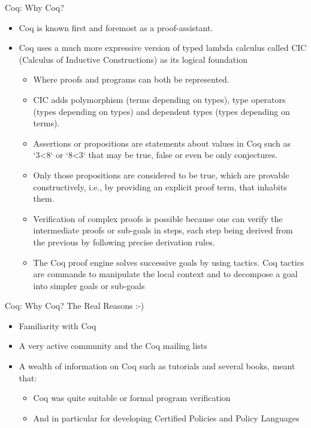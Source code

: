 \documentclass{beamer}
\begin{document}
\begin{frame}[fragile]{Coq: Why Coq?}
\small
\begin{itemize}
\item Coq is known first and foremost as a proof-assistant.
\item Coq uses a much more expressive version of typed lambda calculus called CIC (Calculus of Inductive Constructions) as its logical foundation
    \begin{itemize}
       \item Where proofs and programs can both be represented.
       \item CIC adds polymorphism (terms depending on types), type operators (types depending on types) and dependent types (types depending on terms).
       \item Assertions or propositions are statements about values in Coq such as `3<8` or `8<3` that may be true, false or even be only conjectures. 
       \item Only those propositions are considered to be true, which are provable constructively, i.e., by providing an explicit proof term, that inhabits them.
       \item Verification of complex proofs is possible because one can verify the intermediate proofs or sub-goals in steps, each step being derived from the previous by following precise derivation rules. 
       \item The Coq proof engine solves successive goals by using tactics. Coq tactics are commands to manipulate the local context and to decompose a goal into simpler goals or sub-goals
   \end{itemize}
\end{itemize}
\end{frame}
\begin{frame}[fragile]{Coq: Why Coq? The Real Reasons :-)}
\Large
\begin{itemize}
\item Familiarity with Coq 
\item A very active community and the Coq mailing lists
\item A wealth of information on Coq such as tutorials and several books, meant that:
   \begin{itemize}
       \item Coq was quite suitable or formal program verification
       \item And in particular for developing Certified Policies and Policy Languages
   \end{itemize}
\end{itemize}
\end{frame}
\end{document}
